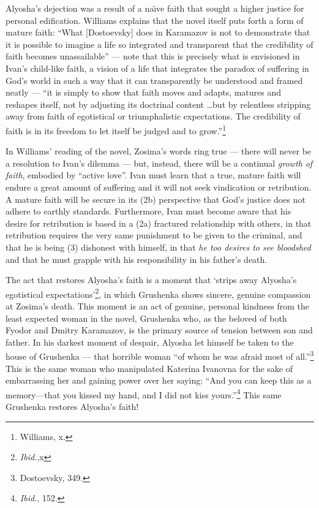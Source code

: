 Alyosha's dejection was a result of a na\"{\i}ve faith that sought a higher justice for personal edification. Williams explains that the novel itself puts forth a form of mature faith: ``What [Dostoevsky] does in Karamazov is not to demonstrate that it is possible to imagine a life so integrated and transparent that the credibility of faith becomes unassailable'' --- note that this is precisely what is envisioned in Ivan's child-like faith, a vision of a life that integrates the paradox of suffering in God's world in such a way that it can transparently be understood and framed neatly --- ``it is simply to show that faith moves and adapts, matures and reshapes itself, not by adjusting its doctrinal content \ldots but by relentless stripping away from faith of egotistical or triumphalistic expectations. The credibility of faith is in its freedom to let itself be judged and to grow.''\footnote{Williams, x.}

In Williams' reading of the novel, Zosima's words ring true --- there will never be a resolution to Ivan's dilemma --- but, instead, there will be a continual \emph{growth of faith}, embodied by ``active love''. Ivan must learn that a true, mature faith will endure a great amount of suffering and it will not seek vindication or retribution. A mature faith will be secure in its (2b) perspective that God's justice does not adhere to earthly standards. Furthermore, Ivan must become aware that his desire for retribution is based in a (2a) fractured relationship with others, in that retribution requires the very same punishment to be given to the criminal, and that he is being (3) dishonest with himself, in that \emph{he too desires to see bloodshed} and that he must grapple with his responsibility in his father's death. 

The act that restores Alyosha's faith is a moment that `strips away Alyosha's egotistical expectations'\footnote{\emph{Ibid.},x}, in which Grushenka shows sincere, genuine compassion at Zosima's death. This moment is an act of genuine, personal kindness from the least expected woman in the novel, Grushenka who, as the beloved of both Fyodor and Dmitry Karamazov, is the primary source of tension between son and father. In his darkest moment of despair, Alyosha let himself be taken to the house of Grushenka --- that horrible woman ``of whom he was afraid most of all.''\footnote{Dostoevsky, 349.} This is the same woman who manipulated Katerina Ivanovna for the sake of embarrassing her and gaining power over her saying: ``And you can keep this as a memory---that you kissed my hand, and I did not kiss yours.''\footnote{\emph{Ibid.}, 152.} This same Grushenka restores Alyosha's faith!

